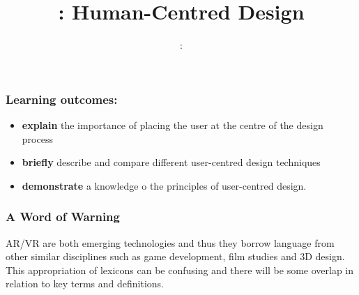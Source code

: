 \usepackage{../../beamerthemeFalmouthGamesAcademy}
\usepackage{multimedia}
\usepackage{soul}
\graphicspath{ {../../} }


\usepackage[normalem]{ulem}
\usepackage{wasysym}

\usepackage{pdfpages}

\usetikzlibrary{arrows,automata}




\title{\sessionnumber: Human-Centred Design}
\subtitle{\modulecode: \moduletitle}

\frame{\titlepage} 

\begin{frame}
	\frametitle{Learning outcomes:}
	\begin{itemize}
		\item \textbf{explain} the importance of placing the user at the centre of the design process
		\item \textbf{briefly} describe and compare different user-centred design techniques
		\item \textbf{demonstrate} a knowledge o the principles of user-centred design.	
	\end{itemize}
\end{frame}

\begin{frame}
	\frametitle{A Word of Warning}
	AR/VR are both emerging technologies and thus they borrow language from other similar disciplines such as game development, film studies and 3D design. This appropriation of lexicons can be confusing and there will be some overlap in relation to key terms and definitions.
\end{frame}

